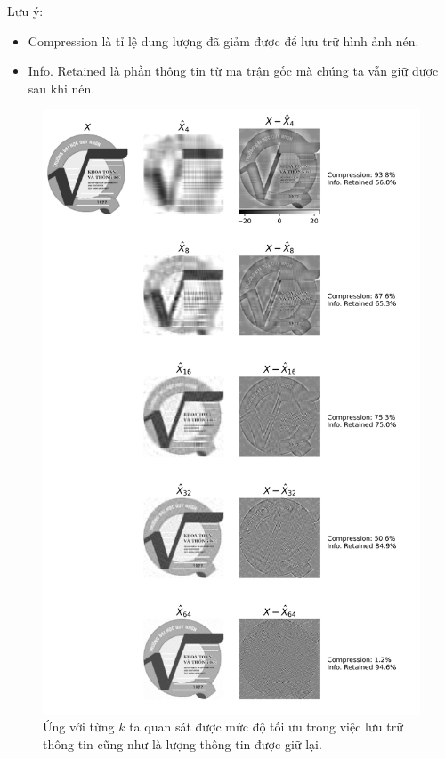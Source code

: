 \documentclass[12pt,a4paper,oneside]{report}
\numberwithin{equation}{section}
\begin{document}
Lưu ý: 
\begin{itemize}
	\item Compression là tỉ lệ dung lượng đã giảm được để lưu trữ hình ảnh nén.
	\item Info. Retained là phần thông tin từ ma trận gốc mà chúng ta vẫn giữ được sau khi nén.
\end{itemize}

\begin{figure}[htp]
	\centering
	\includegraphics[scale=0.7]{svd_qnu.png}
	\caption{Ứng với từng $k$ ta quan sát được mức độ tối ưu trong việc lưu trữ thông tin cũng như là lượng thông tin được giữ lại.}
	\label{fig:svd_qnu}
\end{figure}
\newpage
\end{document}
